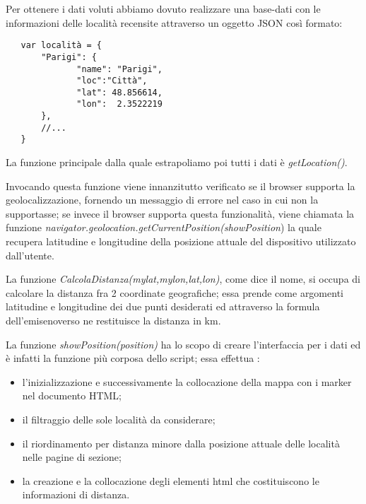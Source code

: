 \begin{flushleft}
Per ottenere i dati voluti abbiamo dovuto realizzare una base-dati con le informazioni delle località recensite attraverso un oggetto JSON così formato:
\end{flushleft}
\begin{verbatim}
   var località = {
       "Parigi": {
	          "name": "Parigi",
	          "loc":"Città",
	          "lat": 48.856614,
	          "lon":  2.3522219
       },
       //...
   }
\end{verbatim}
\begin{flushleft}
La funzione principale dalla quale estrapoliamo poi tutti i dati è
\textit{getLocation()}.

Invocando questa funzione viene innanzitutto verificato se il browser supporta
la geolocalizzazione, fornendo un messaggio di errore nel caso in cui non la
supportasse; se invece il browser supporta questa funzionalità, viene chiamata
la funzione \textit{navigator.geolocation.getCurrentPosition(showPosition}) la
quale recupera latitudine e longitudine della posizione attuale del
dispositivo utilizzato dall'utente.
\end{flushleft}
\begin{flushleft}
La funzione \textit{CalcolaDistanza(mylat,mylon,lat,lon)}, come dice il nome, si occupa di calcolare la distanza fra 2 coordinate geografiche; essa prende come argomenti latitudine e longitudine dei due punti desiderati ed attraverso la formula dell'emisenoverso ne restituisce la distanza in km.
\end{flushleft}

\begin{flushleft}
La funzione \textit{showPosition(position)} ha lo scopo di creare l'interfaccia per i dati ed è infatti la funzione più corposa dello script; essa effettua :
\end{flushleft}
\begin{itemize}
\item l'inizializzazione e successivamente la collocazione  della mappa con i marker nel documento HTML;
\item il filtraggio delle sole località da considerare;
\item il riordinamento per distanza minore dalla posizione attuale delle località nelle pagine di sezione;
\item la creazione e la collocazione degli elementi html che costituiscono le informazioni di distanza.
\end{itemize}



















